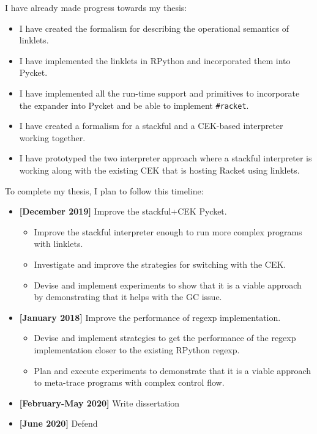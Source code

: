 I have already made progress towards my thesis:

\begin{itemize}
\item I have created the formalism for describing the operational
  semantics of linklets.
\item I have implemented the linklets in RPython and incorporated them into
  Pycket.
\item I have implemented all the run-time support and primitives to
  incorporate the expander into Pycket and be able to implement
  \texttt{\#racket}.
\item I have created a formalism for a stackful and a CEK-based
  interpreter working together.
\item I have prototyped the two interpreter approach where a stackful
  interpreter is working along with the existing CEK that is hosting
  Racket using linklets.
\end{itemize}

To complete my thesis, I plan to follow this timeline:

\begin{itemize}
  \item \textbf{[December 2019]} Improve the stackful+CEK Pycket.
    \begin{itemize}
    \item Improve the stackful interpreter enough to run more complex
      programs with linklets.
     \item Investigate and improve the strategies for switching with
       the CEK.
     \item Devise and implement experiments to show that it is a
       viable approach by demonstrating that it helps with the GC
       issue.
    \end{itemize}
  \item \textbf{[January 2018]} Improve the performance of regexp
    implementation.
    \begin{itemize}
      \item Devise and implement strategies to get the performance of
        the regexp implementation closer to the existing RPython
        regexp.
      \item Plan and execute experiments to demonstrate that it is a
        viable approach to meta-trace programs with complex control
        flow.
    \end{itemize}
  \item \textbf{[February-May 2020]} Write dissertation
  \item \textbf{[June 2020]} Defend
\end{itemize}

